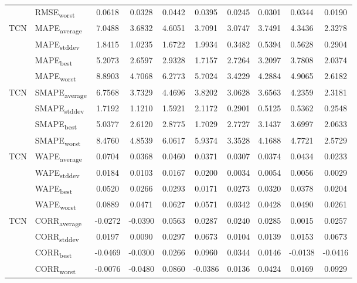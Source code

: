 {\begin{longtable}{l l c c c c c c c c}
 & RMSE\textsubscript{worst} & 0.0618 & 0.0328 & 0.0442 & 0.0395 & 0.0245 & 0.0301 & 0.0344 & 0.0190 \\
\cmidrule(lr){2-10}
\multirow{4}{*}{TCN} & MAPE\textsubscript{average} & 7.0488 & 3.6832 & 4.6051 & 3.7091 & 3.0747 & 3.7491 & 4.3436 & 2.3278 \\
 & MAPE\textsubscript{stddev} & 1.8415 & 1.0235 & 1.6722 & 1.9934 & 0.3482 & 0.5394 & 0.5628 & 0.2904 \\
 & MAPE\textsubscript{best} & 5.2073 & 2.6597 & 2.9328 & 1.7157 & 2.7264 & 3.2097 & 3.7808 & 2.0374 \\
 & MAPE\textsubscript{worst} & 8.8903 & 4.7068 & 6.2773 & 5.7024 & 3.4229 & 4.2884 & 4.9065 & 2.6182 \\
\cmidrule(lr){2-10}
\multirow{4}{*}{TCN} & SMAPE\textsubscript{average} & 6.7568 & 3.7329 & 4.4696 & 3.8202 & 3.0628 & 3.6563 & 4.2359 & 2.3181 \\
 & SMAPE\textsubscript{stddev} & 1.7192 & 1.1210 & 1.5921 & 2.1172 & 0.2901 & 0.5125 & 0.5362 & 0.2548 \\
 & SMAPE\textsubscript{best} & 5.0377 & 2.6120 & 2.8775 & 1.7029 & 2.7727 & 3.1437 & 3.6997 & 2.0633 \\
 & SMAPE\textsubscript{worst} & 8.4760 & 4.8539 & 6.0617 & 5.9374 & 3.3528 & 4.1688 & 4.7721 & 2.5729 \\
\cmidrule(lr){2-10}
\multirow{4}{*}{TCN} & WAPE\textsubscript{average} & 0.0704 & 0.0368 & 0.0460 & 0.0371 & 0.0307 & 0.0374 & 0.0434 & 0.0233 \\
 & WAPE\textsubscript{stddev} & 0.0184 & 0.0103 & 0.0167 & 0.0200 & 0.0034 & 0.0054 & 0.0056 & 0.0029 \\
 & WAPE\textsubscript{best} & 0.0520 & 0.0266 & 0.0293 & 0.0171 & 0.0273 & 0.0320 & 0.0378 & 0.0204 \\
 & WAPE\textsubscript{worst} & 0.0889 & 0.0471 & 0.0627 & 0.0571 & 0.0342 & 0.0428 & 0.0490 & 0.0261 \\
\cmidrule(lr){2-10}
\multirow{4}{*}{TCN} & CORR\textsubscript{average} & -0.0272 & -0.0390 & 0.0563 & 0.0287 & 0.0240 & 0.0285 & 0.0015 & 0.0257 \\
 & CORR\textsubscript{stddev} & 0.0197 & 0.0090 & 0.0297 & 0.0673 & 0.0104 & 0.0139 & 0.0153 & 0.0673 \\
 & CORR\textsubscript{best} & -0.0469 & -0.0300 & 0.0266 & 0.0960 & 0.0344 & 0.0146 & -0.0138 & -0.0416 \\
 & CORR\textsubscript{worst} & -0.0076 & -0.0480 & 0.0860 & -0.0386 & 0.0136 & 0.0424 & 0.0169 & 0.0929 \\

\end{longtable}}
